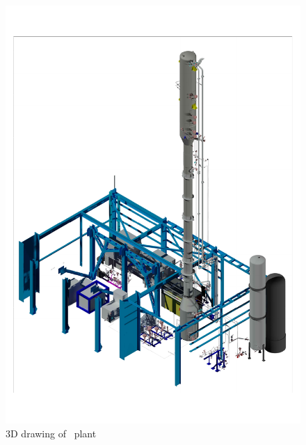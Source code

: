 \begin{figure}[!t]
\centering
\includegraphics[width=1.0\textwidth]{./Figures/Aria_Seruci0_3D.pdf}
\caption[3D drawing of \SeruciZero\ plant]{3D drawing of \SeruciZero\ plant}
\label{fig:Aria-Seruci0-3D}
\end{figure}
